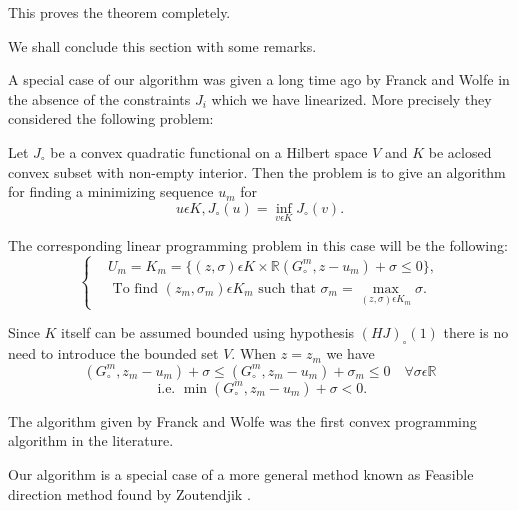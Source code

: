 This proves the theorem completely.

We shall conclude this section with some remarks.

\begin{remark}\label{chap4-rem1.1}
A special case of our algorithm was given a long time ago by Franck and Wolfe \cite{key17} in the absence of the constraints $J_{i}$ which we have linearized. More precisely they considered the following problem:

Let $J_{\circ}$ be a convex quadratic functional on a Hilbert space $V$ and $K$ be a\pageoriginale closed convex subset with non-empty interior. Then the problem is to give an algorithm for finding a minimizing sequence $u_{m}$ for
$$
u \epsilon K, J_{\circ} (u) = \inf\limits_{v \epsilon K} J_{\circ}(v).
$$
\end{remark}

The corresponding linear programming problem in this case will be the following:
\begin{equation*}
\begin{cases}
& U_{m} = K_{m} = \{(z, \sigma) \epsilon K \times \mathbb{R} (G_{\circ}^{m}, z-u_{m}) + \sigma \leq 0\},\\
& \text{ To find } (z_{m}, \sigma_{m}) \epsilon K_{m} \text{ such that } \sigma_{m} = \max_{(z, \sigma) \epsilon K_{m}} \sigma.
\end{cases}
\end{equation*}

Since $K$ itself can be assumed bounded using hypothesis $(HJ)_{\circ} (1)$ there is no need to introduce the bounded set $V$. When $z = z_{m}$ we have
$$
(G_{\circ}^{m}, z_{m} -u_{m}) + \sigma \leq (G_{\circ}^{m}, z_{m}-u_{m}) + \sigma_{m} \leq 0 \quad \forall \sigma \epsilon \mathbb{R}
$$
$$
\text{ i.e. } \min (G_{\circ}^{m}, z_{m}-u_{m}) + \sigma < 0.
$$

The algorithm given by Franck and Wolfe was the first convex programming algorithm in the literature.

\begin{remark}\label{chap4-rem1.2}
Our algorithm is a special case of a more general method known as Feasible direction method found by Zoutendjik \cite{key52}.
\end{remark}

